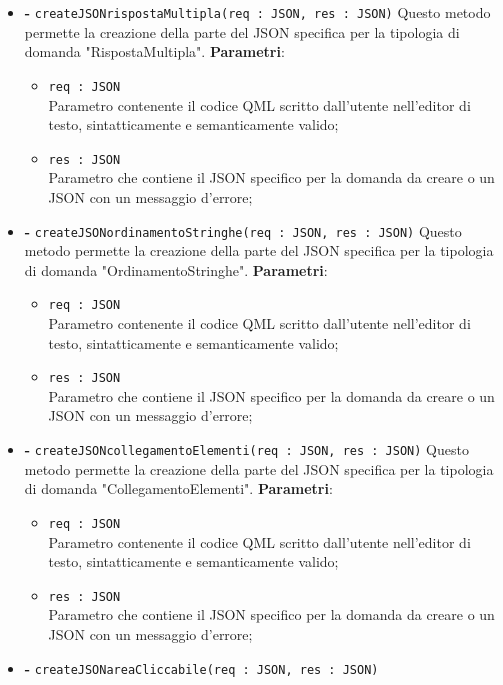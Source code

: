 \begin{itemize}
\begin{itemize}
\begin{itemize}
		\end{itemize}
		\item \textbf{-} \texttt{createJSONrispostaMultipla(req : JSON, res : JSON)}
		Questo metodo permette la creazione della parte del JSON specifica per la tipologia di domanda "RispostaMultipla".
		\textbf{Parametri}:
		\begin{itemize}
			\item \texttt{req : JSON} \\
			Parametro contenente il codice QML scritto dall'utente nell'editor di testo, sintatticamente e semanticamente valido;
			\item \texttt{res : JSON} \\
			Parametro che contiene il JSON specifico per la domanda da creare o un JSON con un messaggio d'errore;
		\end{itemize}
		\item \textbf{-} \texttt{createJSONordinamentoStringhe(req : JSON, res : JSON)}
		Questo metodo permette la creazione della parte del JSON specifica per la tipologia di domanda "OrdinamentoStringhe".
		\textbf{Parametri}:
		\begin{itemize}
			\item \texttt{req : JSON} \\
			Parametro contenente il codice QML scritto dall'utente nell'editor di testo, sintatticamente e semanticamente valido;
			\item \texttt{res : JSON} \\
			Parametro che contiene il JSON specifico per la domanda da creare o un JSON con un messaggio d'errore;
		\end{itemize}
		\item \textbf{-} \texttt{createJSONcollegamentoElementi(req : JSON, res : JSON)}
		Questo metodo permette la creazione della parte del JSON specifica per la tipologia di domanda "CollegamentoElementi".
		\textbf{Parametri}:
		\begin{itemize}
			\item \texttt{req : JSON} \\
			Parametro contenente il codice QML scritto dall'utente nell'editor di testo, sintatticamente e semanticamente valido;
			\item \texttt{res : JSON} \\
			Parametro che contiene il JSON specifico per la domanda da creare o un JSON con un messaggio d'errore;
		\end{itemize}
		\item \textbf{-} \texttt{createJSONareaCliccabile(req : JSON, res : JSON)}

\end{itemize}
\end{itemize}
